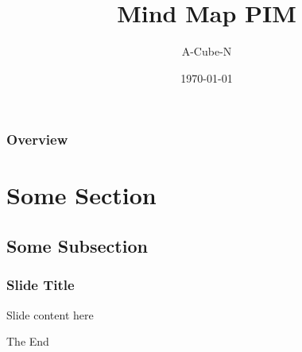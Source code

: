 \documentclass{beamer}
\title[Mind Map PIM]{Mind Map PIM}
\author{A-Cube-N}
\institute[UP]{
	Department of Computer Science, University of Pretoria
}
\date{\today}
\begin{document}
\begin{frame}
	\titlepage
\end{frame}

\begin{frame}
	\frametitle{Overview}
	\tableofcontents
\end{frame}

\section{Some Section}
	\subsection{Some Subsection}
		\begin{frame}
		\frametitle{Slide Title}
		Slide content here
		\end{frame}

\begin{frame}
	\Huge{\centerline{The End}}
\end{frame}
\end{document}
